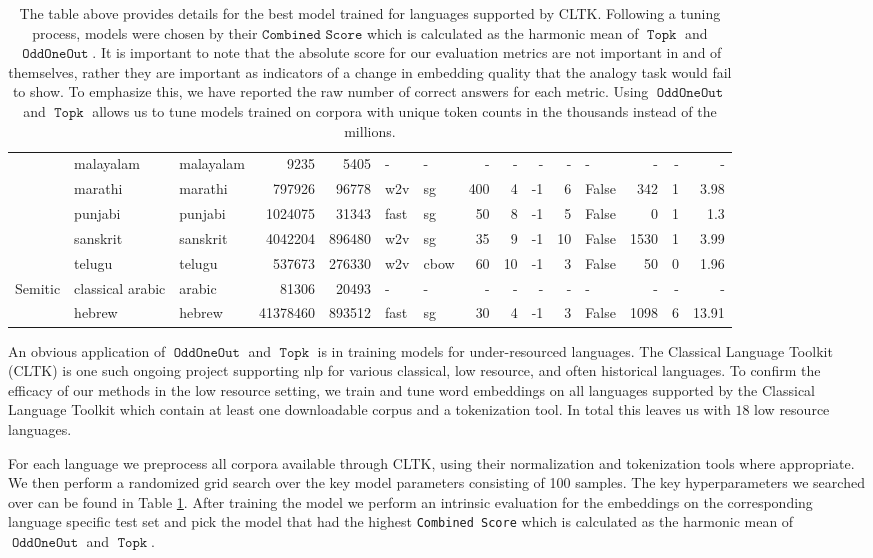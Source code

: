 \documentclass[11pt,a4paper]{article}
\DeclareMathOperator{\OddOneOut}{\texttt{OddOneOut}}
\DeclareMathOperator{\topk}{\texttt{Topk}}
\begin{document}
\begin{table}[t]
{\begin{tabular}{l|llrr|llrrrrl|rrr}
    &malayalam & malayalam& \num{9235} & \num{5405} & - & - & - & - & - & - & - & - & - & - \\
    &marathi & marathi & \num{797926} & \num{96778} & w2v & sg & 400 & 4 & -1 & 6 & False & 342 & 1 & 3.98 \\
    &punjabi & punjabi & \num{1024075} & \num{31343} & fast & sg & 50 & 8 & -1 & 5 & False & 0 & 1 & 1.3 \\
    &sanskrit & sanskrit & \num{4042204} & \num{896480} & w2v & sg & 35 & 9 & -1 & 10 & False & 1530 & 1 & 3.99\\
    &telugu & telugu & \num{537673} & \num{276330} &  w2v & cbow & 60 & 10 & -1 & 3 & False & 50 & 0 & 1.96 \\
    \midrule
    \multirow{2}{*}{Semitic}&classical arabic & arabic& \num{81306} & \num{20493} & - & - & - & - & - & - & - & - & - & - \\
    &hebrew & hebrew & \num{41378460} & \num{893512} & fast & sg & 30 & 4 & -1 & 3 & False & 1098 & 6 & 13.91 \\  
\bottomrule
\end{tabular}
}
\caption{The table above provides details for the best model trained for languages supported by CLTK.
Following a tuning process, models were chosen by their $\texttt{Combined Score}$
which is calculated as the harmonic mean of $\topk$ and $\OddOneOut$.
It is important to note that the absolute score for our evaluation metrics are not important in and of themselves,
rather they are important as indicators of a change in embedding quality that the analogy task would fail to show.
To emphasize this, we have reported the raw number of correct answers for each metric.
Using $\OddOneOut$ and $\topk$ allows us to tune models trained on corpora with unique token counts in the thousands instead of the millions.}
\label{table:language}
\end{table}

An obvious application of $\OddOneOut$ and $\topk$ is in training models for under-resourced languages. 
The Classical Language Toolkit (CLTK) \cite{johnson2014} is one such ongoing project supporting nlp for various classical, low resource, and often historical languages.
To confirm the efficacy of our methods in the low resource setting, we train and tune word embeddings on all languages supported by the Classical Language Toolkit which contain at least one downloadable corpus and a tokenization tool. 
In total this leaves us with $18$ low resource languages.

For each language we preprocess all corpora available through CLTK, using their normalization and tokenization tools where appropriate. 
We then perform a randomized grid search over the key model parameters consisting of 100 samples. 
The key hyperparameters we searched over can be found in Table \ref{table:language}. 
After training the model we perform an intrinsic evaluation for the embeddings on the corresponding language specific test set 
and pick the model that had the highest \texttt{Combined Score} 
which is calculated as the harmonic mean of $\OddOneOut$ and $\topk$.
\end{document}
